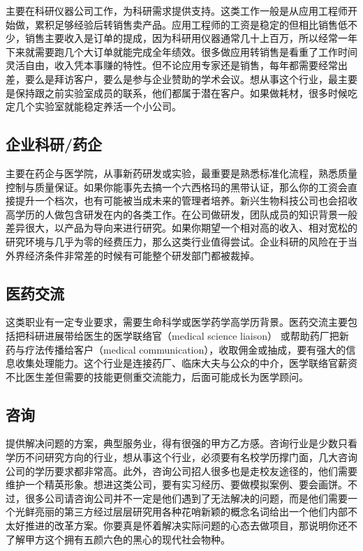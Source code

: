 \documentclass[]{tufte-book}
\begin{document}
主要在科研仪器公司工作，为科研需求提供支持。这类工作一般是从应用工程师开始做，累积足够经验后转销售卖产品。应用工程师的工资是稳定的但相比销售低不少，销售主要收入是订单的提成，因为科研用仪器通常几十上百万，所以经常一年下来就需要跑几个大订单就能完成全年绩效。很多做应用转销售是看重了工作时间灵活自由，收入凭本事赚的特性。但不论应用专家还是销售，每年都需要经常出差，要么是拜访客户，要么是参与企业赞助的学术会议。想从事这个行业，最主要是保持跟之前实验室成员的联系，他们都属于潜在客户。如果做耗材，很多时候吃定几个实验室就能稳定养活一个小公司。

\hypertarget{ux4f01ux4e1aux79d1ux7814ux836fux4f01}{%
\subsection{企业科研/药企}\label{ux4f01ux4e1aux79d1ux7814ux836fux4f01}}

主要在药企与医学院，从事新药研发或实验，最重要是熟悉标准化流程，熟悉质量控制与质量保证。如果你能事先去搞一个六西格玛的黑带认证，那么你的工资会直接提升一个档次，也有可能被当成未来的管理者培养。新兴生物科技公司也会招收高学历的人做包含研发在内的各类工作。在公司做研发，团队成员的知识背景一般差异很大，以产品为导向来进行研究。如果你期望一个相对高的收入、相对宽松的研究环境与几乎为零的经费压力，那么这类行业值得尝试。企业科研的风险在于当外界经济条件非常差的时候有可能整个研发部门都被裁掉。

\hypertarget{ux533bux836fux4ea4ux6d41}{%
\subsection{医药交流}\label{ux533bux836fux4ea4ux6d41}}

这类职业有一定专业要求，需要生命科学或医学药学高学历背景。医药交流主要包括把科研进展带给医生的医学联络官（medical science liaison）
或帮助药厂把新药与疗法传播给客户（medical communication），收取佣金或抽成，要有强大的信息收集处理能力。这个行业是连接药厂、临床大夫与公众的中介，医学联络官薪资不比医生差但需要的技能更侧重交流能力，后面可能成长为医学顾问。

\hypertarget{ux54a8ux8be2}{%
\subsection{咨询}\label{ux54a8ux8be2}}

提供解决问题的方案，典型服务业，得有很强的甲方乙方感。咨询行业是少数只看学历不问研究方向的行业，想从事这个行业，必须要有名校学历撑门面，几大咨询公司的学历要求都非常高。此外，咨询公司招人很多也是走校友途径的，他们需要维护一个精英形象。想进这类公司，要有实习经历、要做模拟案例、要会画饼。不过，很多公司请咨询公司并不一定是他们遇到了无法解决的问题，而是他们需要一个光鲜亮丽的第三方经过层层研究用各种花哨新颖的概念名词给出一个他们内部不太好推进的改革方案。你要真是怀着解决实际问题的心态去做项目，那说明你还不了解甲方这个拥有五颜六色的黑心的现代社会物种。
\end{document}
